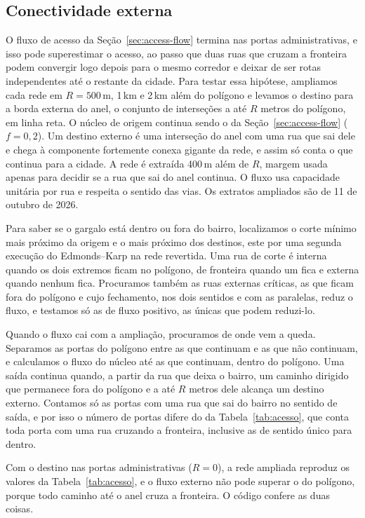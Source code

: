 \subsection{Conectividade externa}
\label{sec:external-conn}

O fluxo de acesso da Seção~\ref{sec:access-flow} termina nas portas
administrativas, e isso pode superestimar o acesso, ao passo que duas ruas que cruzam a
fronteira podem convergir logo depois para o mesmo corredor e deixar de ser
rotas independentes até o restante da cidade. Para testar essa hipótese,
ampliamos cada rede em $R=500$\,m, 1\,km e 2\,km além do polígono e levamos
o destino para a borda externa do anel, o conjunto de interseções a até $R$
metros do polígono, em linha reta. O núcleo de origem continua sendo o da
Seção~\ref{sec:access-flow} ($f=0{,}2$). Um destino externo é uma interseção
do anel com uma rua que sai dele e chega à componente fortemente conexa
gigante da rede, e assim só conta o que continua para a cidade. A rede é
extraída 400\,m além de $R$, margem usada apenas para decidir se a rua que
sai do anel continua. O fluxo usa capacidade unitária por rua e respeita o
sentido das vias. Os extratos ampliados são de 11 de outubro de 2026.

Para saber se o gargalo está dentro ou fora do bairro, localizamos o corte
mínimo mais próximo da origem e o mais próximo dos destinos, este por uma
segunda execução do Edmonds--Karp na rede revertida. Uma rua de corte é
interna quando os dois extremos ficam no polígono, de fronteira quando um
fica e externa quando nenhum fica. Procuramos também as ruas externas
críticas, as que ficam fora do polígono e cujo fechamento, nos dois sentidos
e com as paralelas, reduz o fluxo, e testamos só as de fluxo positivo, as
únicas que podem reduzi-lo.

Quando o fluxo cai com a ampliação, procuramos de onde vem a queda.
Separamos as portas do polígono entre as que continuam e as que não
continuam, e calculamos o fluxo do núcleo até as que continuam, dentro do
polígono. Uma saída continua quando, a partir da rua que deixa o bairro, um
caminho dirigido que permanece fora do polígono e a até $R$ metros dele
alcança um destino externo. Contamos só as portas com uma rua que sai do
bairro no sentido de saída, e por isso o número de portas difere do da
Tabela~\ref{tab:acesso}, que conta toda porta com uma rua cruzando a
fronteira, inclusive as de sentido único para dentro.

Com o destino nas portas administrativas ($R=0$), a rede ampliada reproduz
os valores da Tabela~\ref{tab:acesso}, e o fluxo externo não pode superar o
do polígono, porque todo caminho até o anel cruza a fronteira. O código
confere as duas coisas.

